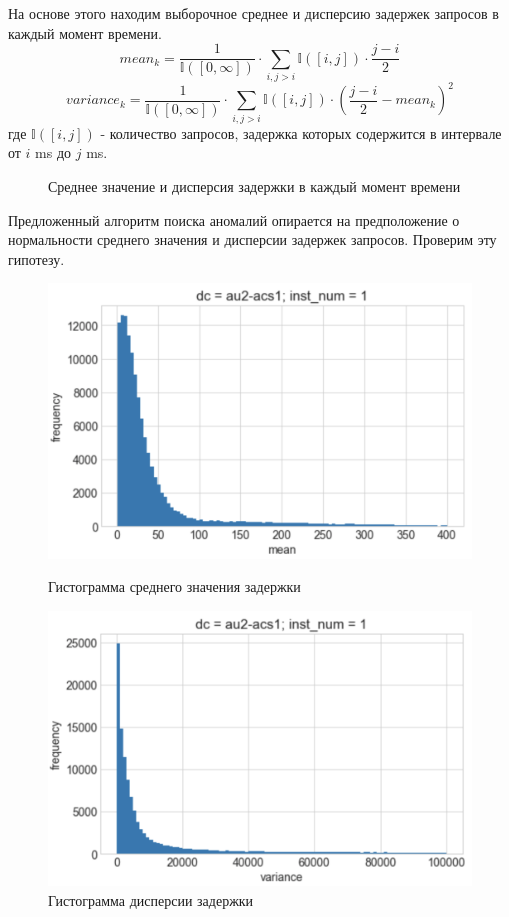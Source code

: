 \documentclass[14pt, a4paper]{extarticle}
\begin{document}
	 На основе этого находим выборочное среднее и дисперсию задержек запросов в каждый момент времени.
	 $$mean_k = \dfrac{1}{\mathbb {I}([0, \infty])} \cdot \sum _{i, j>i}\mathbb {I}([i, j]) \cdot \dfrac{j - i}{2} $$
	 $$variance_k = \dfrac{1}{\mathbb {I}([0, \infty])} \cdot \sum _{i, j>i}\mathbb {I}([i, j]) \cdot \left( \dfrac{j - i}{2} - mean_k\right) ^2 $$
	  где $\mathbb {I}([i, j])$ - количество запросов, задержка которых содержится в интервале от $i$ ms до  $ j$ ms. 
	 \begin{figure}[H]
		\centerline{} 
		\caption{Среднее значение и дисперсия задержки в каждый момент времени}
		\label{target_metric_fig1}
	\end{figure} 
	Предложенный алгоритм поиска аномалий опирается на предположение о нормальности среднего значения и дисперсии задержек запросов. Проверим эту гипотезу.
	\begin{figure}[!htb]
		\includegraphics[width=\linewidth]{figures/mean_hist.png}
		\caption{Гистограмма среднего значения задержки}
		\endminipage\hfill
		\includegraphics[width=\linewidth]{figures/variance_hist.png}
		\caption{Гистограмма дисперсии задержки}
		\endminipage
	\end{figure}
	
\end{document}
